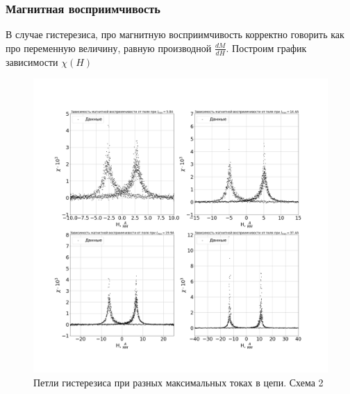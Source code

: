 \documentclass[a4paper,14pt]{extarticle}
\begin{document}
			\subsubsection{Магнитная восприимчивость}
				В случае гистерезиса, про магнитную восприимчивость корректно говорить как про переменную величину, равную производной $\frac{dM}{dH}$. Построим график зависимости $\chi(H)$
				\begin{figure}[h]
					\centering
					\includegraphics[width=1.0\linewidth]{Lab2_5.png}
					\caption{Петли гистерезиса при разных максимальных токах в цепи. Схема 2}
					\label{fig8}
				\end{figure}
\end{document}
